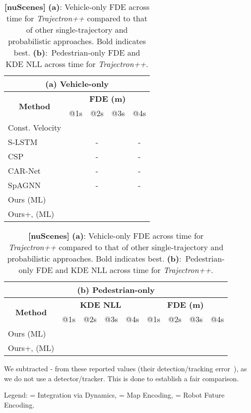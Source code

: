 \documentclass[runningheads]{llncs}
\newcommand{\algname}{\mbox{Trajectron++}}
\newcommand{\emphalgname}{\emph{\algname}}
\newcommand\Tstrut{\rule{0pt}{2.6ex}}       \newcommand\Bstrut{\rule[-0.9ex]{0pt}{0pt}} \newcommand{\TBstrut}{\Tstrut\Bstrut}
\begin{document}
\begin{table}[t]
\fontsize{6.5}{6.5}\selectfont
\centering
\caption{\textbf{[nuScenes]} \textbf{(a)}: Vehicle-only FDE across time for \emphalgname{}
compared to that of other single-trajectory and probabilistic approaches. Bold indicates best. \textbf{(b)}:~Pedestrian-only FDE and KDE NLL across time for \emphalgname{}.
}
\begin{tabular}{l|cccc}
\toprule
\multicolumn{5}{c}{(a) \textbf{Vehicle-only}}\\
\midrule
\multicolumn{1}{c|}{\multirow{2}{*}{\textbf{Method}}} & \multicolumn{4}{c}{\textbf{FDE (m)}} \Bstrut \\
\cline{2-5} & @1s & @2s & @3s & @4s \Tstrut \\
\midrule
Const. Velocity &  &  &  & \\
S-LSTM~\cite{AlahiGoelEtAl2016,CasasGulinoEtAl2019} &  & - &  & - \\
CSP~\cite{DeoTrivedi2018,CasasGulinoEtAl2019} &  & - &  & - \\
CAR-Net~\cite{SadeghianLegrosEtAl2018,CasasGulinoEtAl2019} &  & - &  & - \\
SpAGNN~\cite{CasasGulinoEtAl2019} &  & - &  & - \\
\midrule
Ours (ML) &  &  &  & \\
Ours+, (ML) &  &  &  & \\
\bottomrule
\end{tabular}
\hfill \begin{tabular}{l|cccc|cccc}
\toprule
\multicolumn{9}{c}{(b) \textbf{Pedestrian-only}}\\
\midrule
\multicolumn{1}{c|}{\multirow{2}{*}{\textbf{Method}}} & \multicolumn{4}{c|}{\textbf{KDE NLL}} & \multicolumn{4}{c}{\textbf{FDE (m)}} \Bstrut \\
\cline{2-9} & @1s & @2s & @3s & @4s & @1s & @2s & @3s & @4s \Tstrut \\
\midrule
Ours (ML) &  &  &  &  &  &  &  & \\
Ours+, (ML) &   &  &   &  &  &  &  &  \\
\bottomrule
\end{tabular}
\label{tab:nuscenes_fde}
\label{tab:nuscenes_ped}

\fontsize{7}{7}\selectfont
We subtracted - from these reported values (their detection/tracking error~\cite{CasasGulinoEtAl2019}), as we do not use a detector/tracker. This is done to establish a fair comparison.

Legend:  = Integration via Dynamics,  = Map Encoding,  = Robot Future Encoding.
\end{table}
\end{document}

